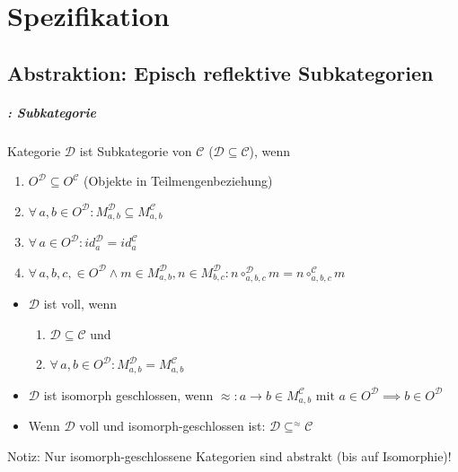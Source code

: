 \chapter{Spezifikation}

\section{Abstraktion: Episch reflektive Subkategorien}

\paragraph{: Subkategorie}
Kategorie $\mathcal{D}$ ist Subkategorie von $\mathcal{C}$ ($\mathcal{D} \subseteq \mathcal{C}$), wenn
\begin{enumerate}
\item $O^\mathcal{D} \subseteq O^\mathcal{C}$ (Objekte in Teilmengenbeziehung)
\item $\forall \, a,b \in O^\mathcal{D}:  M^\mathcal{D}_{a,b} \subseteq M^\mathcal{C}_{a,b} $
\item $\forall \, a \in O^\mathcal{D}: id^\mathcal{D}_a = id^\mathcal{C}_a$
\item $\forall \, a,b,c, \in O^\mathcal{D} \wedge m \in M^\mathcal{D}_{a,b}, n \in M^\mathcal{D}_{b,c}: n \circ^{\mathcal{D}}_{a,b,c} m  = n \circ^{\mathcal{C}}_{a,b,c} m  $
\end{enumerate}

\begin{itemize}
\item $\mathcal{D}$ ist voll, wenn
\begin{enumerate}
\item $\mathcal{D} \subseteq \mathcal{C}$ und
\item $\forall \, a,b \in O^\mathcal{D}:  M^\mathcal{D}_{a,b} = M^\mathcal{C}_{a,b} $
\end{enumerate}
\item $\mathcal{D}$ ist isomorph geschlossen, wenn $\approx: a \rightarrow b \in M^\mathcal{C}_{a,b} \text{ mit } a \in O^\mathcal{D} \implies b \in O^\mathcal{D}$
\item Wenn $\mathcal{D}$ voll und isomorph-geschlossen ist: $\mathcal{D} \subseteq^{\approx} \mathcal{C}$
\end{itemize}

Notiz: Nur isomorph-geschlossene Kategorien sind abstrakt (bis auf Isomorphie)!

